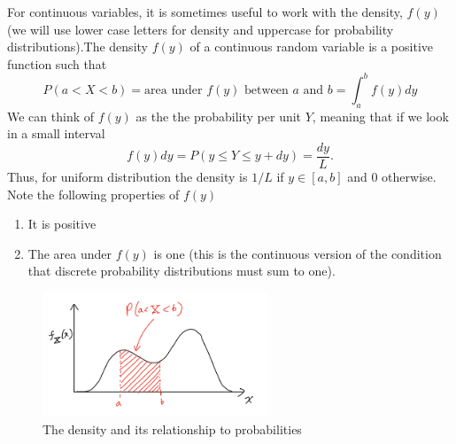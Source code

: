  For continuous variables, it is sometimes useful to work with the density, $f(y)$ (we will use lower case letters for density and uppercase for probability distributions).The density $f(y)$ of a continuous random variable is a positive function such that 
\begin{equation*}
P(a<X<b) = \text{area under $f(y)$ between $a$ and $b$} = \int_a^bf(y)dy
\end{equation*}
We can think of $f(y)$ as the the probability per unit $Y$, meaning that if we look in a small interval 
 \begin{equation*}
f(y)dy = P(y \le Y \le y+dy) = \frac{dy}{L}.
 \end{equation*}
 Thus, for uniform distribution the density is $1/L$ if $y \in [a,b]$ and $0$ otherwise.  Note the following properties of $f(y)$
 \begin{enumerate}
 \item It is positive
 \item The area under $f(y)$ is one (this is the continuous version of the condition that discrete probability distributions must sum to one). 
 \end{enumerate}


\begin{figure}[h]
\centering
\includegraphics[width=0.6\textwidth]{./../figures/density}
\caption{The density and its relationship to probabilities}\label{fig:density}
\end{figure}



